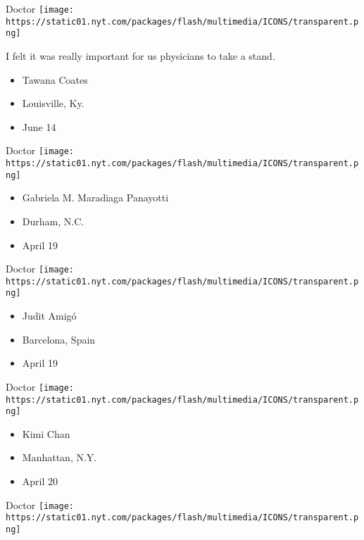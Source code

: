 \protect\hyperlink{item-tawana-coates}{}

Doctor
\texttt{[image: https://static01.nyt.com/packages/flash/multimedia/ICONS/transparent.png]}

I felt it was really important for us physicians to take a stand.

\begin{itemize}
\tightlist
\item
  Tawana Coates
\item
  Louisville, Ky.
\item
  June 14
\end{itemize}

\protect\hyperlink{item-gabriela-m-maradiaga-panayotti}{}

Doctor
\texttt{[image: https://static01.nyt.com/packages/flash/multimedia/ICONS/transparent.png]}

\begin{itemize}
\tightlist
\item
  Gabriela M. Maradiaga Panayotti
\item
  Durham, N.C.
\item
  April 19
\end{itemize}

\protect\hyperlink{item-judit-amigo}{}

Doctor
\texttt{[image: https://static01.nyt.com/packages/flash/multimedia/ICONS/transparent.png]}

\begin{itemize}
\tightlist
\item
  Judit Amigó
\item
  Barcelona, Spain
\item
  April 19
\end{itemize}

\protect\hyperlink{item-kimi-chan}{}

Doctor
\texttt{[image: https://static01.nyt.com/packages/flash/multimedia/ICONS/transparent.png]}

\begin{itemize}
\tightlist
\item
  Kimi Chan
\item
  Manhattan, N.Y.
\item
  April 20
\end{itemize}

\protect\hyperlink{item-manish-garg}{}

Doctor
\texttt{[image: https://static01.nyt.com/packages/flash/multimedia/ICONS/transparent.png]}

